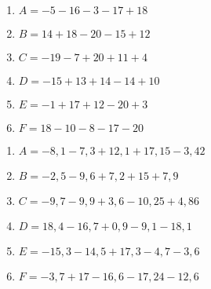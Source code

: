 \documentclass[11pt]{article}
\begin{document}
 
\begin{exercice}
\begin{multicols}{2}
\begin{enumerate}[label={}]
	\item \begin{minipage}[t]{\linewidth} $ A = -5-16-3-17+18$ \end{minipage}
	\item \begin{minipage}[t]{\linewidth} $ B = 14+18-20-15+12$ \end{minipage}
	\item \begin{minipage}[t]{\linewidth} $ C = -19-7+20+11+4$ \end{minipage}
	\item \begin{minipage}[t]{\linewidth} $ D = -15+13+14-14+10$ \end{minipage}
	\item \begin{minipage}[t]{\linewidth} $ E = -1+17+12-20+3$ \end{minipage}
	\item \begin{minipage}[t]{\linewidth} $ F = 18-10-8-17-20$ \end{minipage}
\end{enumerate}
\end{multicols}
\end{exercice}

\begin{exercice}
\begin{multicols}{2}
\begin{enumerate}[label={}]
	\item \begin{minipage}[t]{\linewidth} $ A = -8{,}1-7{,}3+12{,}1+17{,}15-3{,}42$ \end{minipage}
	\item \begin{minipage}[t]{\linewidth} $ B = -2{,}5-9{,}6+7{,}2+15+7{,}9$ \end{minipage}
	\item \begin{minipage}[t]{\linewidth} $ C = -9{,}7-9{,}9+3{,}6-10{,}25+4{,}86$ \end{minipage}
	\item \begin{minipage}[t]{\linewidth} $ D = 18{,}4-16{,}7+0{,}9-9{,}1-18{,}1$ \end{minipage}
	\item \begin{minipage}[t]{\linewidth} $ E = -15{,}3-14{,}5+17{,}3-4{,}7-3{,}6$ \end{minipage}
	\item \begin{minipage}[t]{\linewidth} $ F = -3{,}7+17-16{,}6-17{,}24-12{,}6$ \end{minipage}
\end{enumerate}
\end{multicols}
\end{exercice}
\end{document}
